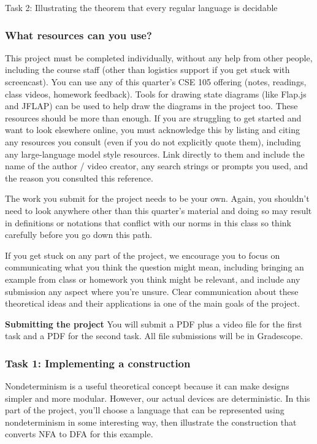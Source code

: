 Task 2: Illustrating the theorem that every regular language is decidable


\subsubsection*{What resources can you use?} This project must be completed individually, 
without any help from other people, including the course staff (other than logistics support if 
you get stuck with screencast).
You can use any of this quarter's CSE 105 offering (notes, readings, class videos, homework feedback). 
Tools for drawing state diagrams (like Flap.js and JFLAP) can be used to help draw the diagrams 
in the project too.
These resources should be more than enough.
If you are struggling to get started and want to look elsewhere online, 
you must acknowledge this by listing and citing any resources you consult 
(even if you do not explicitly quote them), including any large-language model style resources. 
Link directly to them and include the name of the author / video creator, 
any search strings or prompts you used, and the reason you consulted this reference.

The work you submit for the project needs to be your own. Again, you shouldn't need to look anywhere 
other than this quarter's material and doing so may result in definitions or notations that 
conflict with our norms in this class so think carefully before you go down this path.

If you get stuck on any part of the project, we encourage you to focus on communicating what you think 
the question might mean, including bringing an example from class or homework you think might be relevant, and 
include any submission any aspect where you're unsure. Clear communication about these
theoretical ideas and their applications ia one of the main goals of the project.

{\bf Submitting the project} You will submit a PDF plus a video file for the first task and a PDF for the 
second task. All file submissions will be in Gradescope.

\newpage
\subsubsection*{Task 1: Implementing a construction}

Nondeterminism is a useful theoretical concept because it can make designs simpler and more modular. 
However, our actual devices are deterministic. In this part of the project, you'll choose a 
language that can be represented using nondeterminism in some interesting way, then illustrate
the construction that converts NFA to DFA for this example.

